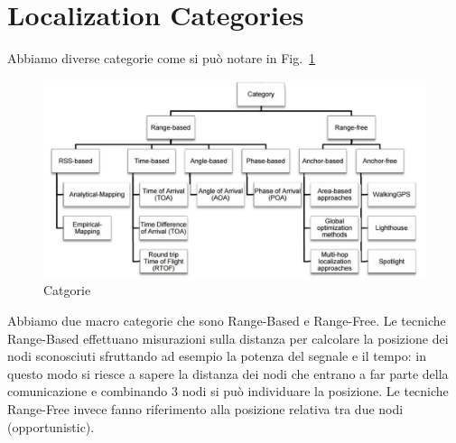         \section{Localization Categories}\label{subsec3.4}
        Abbiamo diverse categorie come si può notare in
Fig.~\ref{fig:fig3-lec3pt1}
        \begin{figure}
                \centering
                \includegraphics[scale=0.6]{fig3-lec3pt1.png}
                \caption{Catgorie}
                \label{fig:fig3-lec3pt1}
        \end{figure}
        Abbiamo due macro categorie che sono Range-Based e Range-Free.
        Le tecniche Range-Based effettuano misurazioni sulla distanza per
calcolare la posizione dei nodi sconosciuti sfruttando ad esempio la potenza del
segnale e il tempo: in questo modo si riesce a sapere la distanza dei nodi che
entrano a far parte della comunicazione e combinando 3 nodi si può individuare
la posizione. Le tecniche Range-Free invece fanno riferimento alla posizione
relativa tra due nodi (opportunistic).
